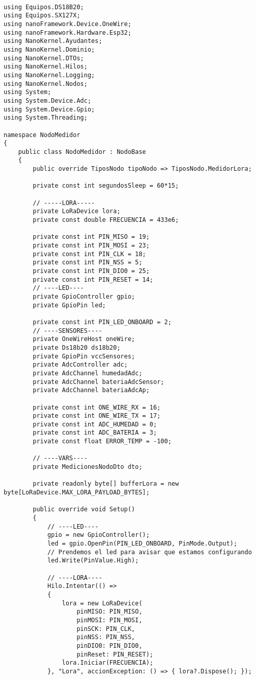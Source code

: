 \begin{lstlisting}[caption={Ejemplo de código en C\#}]

using Equipos.DS18B20;
using Equipos.SX127X;
using nanoFramework.Device.OneWire;
using nanoFramework.Hardware.Esp32;
using NanoKernel.Ayudantes;
using NanoKernel.Dominio;
using NanoKernel.DTOs;
using NanoKernel.Hilos;
using NanoKernel.Logging;
using NanoKernel.Nodos;
using System;
using System.Device.Adc;
using System.Device.Gpio;
using System.Threading;

namespace NodoMedidor
{
    public class NodoMedidor : NodoBase
    {
        public override TiposNodo tipoNodo => TiposNodo.MedidorLora;

        private const int segundosSleep = 60*15;

        // -----LORA-----
        private LoRaDevice lora;
        private const double FRECUENCIA = 433e6;

        private const int PIN_MISO = 19;
        private const int PIN_MOSI = 23;
        private const int PIN_CLK = 18;
        private const int PIN_NSS = 5;
        private const int PIN_DIO0 = 25;
        private const int PIN_RESET = 14;
        // ----LED----
        private GpioController gpio;
        private GpioPin led;

        private const int PIN_LED_ONBOARD = 2;
        // ----SENSORES----
        private OneWireHost oneWire;
        private Ds18b20 ds18b20;
        private GpioPin vccSensores;
        private AdcController adc;
        private AdcChannel humedadAdc;
        private AdcChannel bateriaAdcSensor;
        private AdcChannel bateriaAdcAp;

        private const int ONE_WIRE_RX = 16;  
        private const int ONE_WIRE_TX = 17;
        private const int ADC_HUMEDAD = 0;
        private const int ADC_BATERIA = 3;
        private const float ERROR_TEMP = -100;
        
        // ----VARS----
        private MedicionesNodoDto dto;

        private readonly byte[] bufferLora = new byte[LoRaDevice.MAX_LORA_PAYLOAD_BYTES];

        public override void Setup()
        {
            // ----LED----
            gpio = new GpioController();
            led = gpio.OpenPin(PIN_LED_ONBOARD, PinMode.Output);
            // Prendemos el led para avisar que estamos configurando
            led.Write(PinValue.High);   

            // ----LORA----
            Hilo.Intentar(() =>
            {
                lora = new LoRaDevice(
                    pinMISO: PIN_MISO,
                    pinMOSI: PIN_MOSI,
                    pinSCK: PIN_CLK,
                    pinNSS: PIN_NSS,
                    pinDIO0: PIN_DIO0,
                    pinReset: PIN_RESET);
                lora.Iniciar(FRECUENCIA);
            }, "Lora", accionException: () => { lora?.Dispose(); });


\end{lstlisting}
